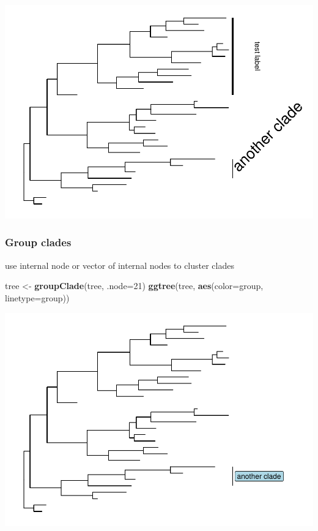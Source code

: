 \documentclass[]{article}
\newenvironment{Shaded}{\begin{snugshade}}{\end{snugshade}}
\newcommand{\KeywordTok}[1]{\textcolor[rgb]{0.13,0.29,0.53}{\textbf{#1}}}
\newcommand{\DataTypeTok}[1]{\textcolor[rgb]{0.13,0.29,0.53}{#1}}
\newcommand{\DecValTok}[1]{\textcolor[rgb]{0.00,0.00,0.81}{#1}}
\newcommand{\StringTok}[1]{\textcolor[rgb]{0.31,0.60,0.02}{#1}}
\newcommand{\NormalTok}[1]{#1}
\begin{document}
\includegraphics{ggtree_files/figure-latex/unnamed-chunk-13-1.pdf}

\subsubsection{Group clades}\label{group-clades}

use internal node or vector of internal nodes to cluster clades

\begin{Shaded}
\begin{Highlighting}[]
\NormalTok{tree <-}\StringTok{ }\KeywordTok{groupClade}\NormalTok{(tree, }\DataTypeTok{.node=}\DecValTok{21}\NormalTok{)}
\KeywordTok{ggtree}\NormalTok{(tree, }\KeywordTok{aes}\NormalTok{(}\DataTypeTok{color=}\NormalTok{group, }\DataTypeTok{linetype=}\NormalTok{group))}
\end{Highlighting}
\end{Shaded}

\includegraphics{ggtree_files/figure-latex/unnamed-chunk-14-1.pdf}
\end{document}
